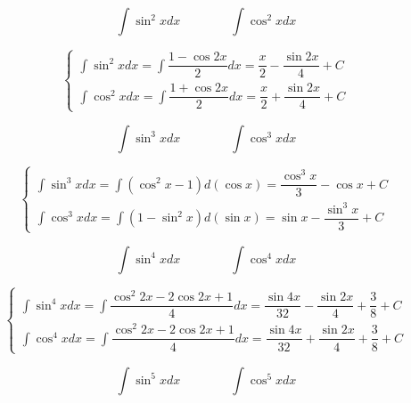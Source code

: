 \begin{corollary}[扩展不定积分]
	\begin{proposition}
		$$\int \sin^{2}x dx\qquad\qquad \int \cos^{2} xdx $$
	\end{proposition}
	\begin{solution}

		$$\begin{cases} \int \sin^{2} x dx = \int \dfrac{1-\cos 2x}{2} dx = \dfrac{x}{2} -\dfrac{\sin 2x}{4} +C\\ \int \cos^{2} x dx = \int \dfrac{1+\cos 2x}{2} dx = \dfrac{x}{2} +\dfrac{\sin 2x}{4} +C \end{cases}$$
	\end{solution}


	\begin{proposition}
		$$\int \sin^{3}x dx\qquad\qquad \int \cos^{3} xdx $$
	\end{proposition}
	\begin{solution}

		$$\begin{cases} \int \sin^{3} x dx = \int (\cos^{2}x -1) d(\cos x) = \dfrac{\cos^{3}x}{3} -\cos x +C\\ \int \cos^{3} x dx = \int (1-\sin^{2} x) d(\sin x) = \sin x - \dfrac{\sin^{3} x}{3} +C \end{cases}$$
	\end{solution}



	\begin{proposition}
		$$\int \sin^{4}x dx\qquad\qquad \int \cos^{4} xdx $$
	\end{proposition}
	\begin{solution}

		$$\begin{cases} \int \sin^{4} x dx = \int \dfrac{\cos^{2}2x-2\cos 2x+1}{4} dx = \dfrac{\sin 4x}{32} -\dfrac{\sin 2x}{4} + \dfrac{3}{8} + C\\ \int \cos^{4} x dx = \int \dfrac{\cos^{2}2x-2\cos 2x+1}{4} dx = \dfrac{\sin 4x}{32} + \dfrac{\sin 2x}{4} + \dfrac{3}{8} + C \end{cases}$$
	\end{solution}



	\begin{proposition}
		$$\int \sin^{5}x dx\qquad\qquad \int \cos^{5} xdx $$
	\end{proposition}
	\begin{solution}


\end{solution}
\end{corollary}
